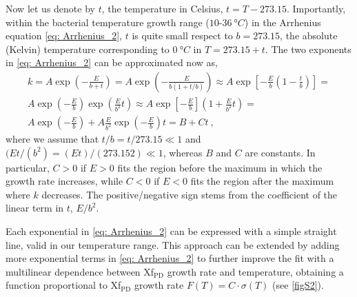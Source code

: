 Now let us denote by $t$, the temperature in Celsius, $t= T-273.15$.
Importantly, within the bacterial temperature growth range
($10$-$\SI{36}{\degree C}$) in the Arrhenius equation \cref{eq: Arrhenius_2},
$t$ is quite small respect to $b = 273.15$, the absolute (Kelvin) temperature
corresponding to $\SI{0}{\degree C}$ in $T = 273.15 + t$. The two exponents in
\cref{eq: Arrhenius_2} can be approximated now as,
\begin{multline}
    k=A \exp \left(-\frac{E}{b+t}\right)=A \exp
    \left(-\frac{E}{b(1+t/b)}\right) \approx A \exp
    \left[-\frac{E}{b}\left(1-\frac{t}{b}\right)\right]= \\
    A \exp \left(-\frac{E}{b}\right) \exp \left(\frac{E}{b^{2}} t\right)
    \approx A \exp \left[-\frac{E}{b}\right]\left(1+\frac{E}{b^{2}}
    t\right)= \\
    A \exp \left(-\frac{E}{b}\right)+A \frac{E}{b^{2}} \exp
    \left(-\frac{E}{b}\right) t=B+C t \ ,
\end{multline}
\label{eq:tempapprox}
where we assume that $t/b = t/273.15 \ll1$ and	$(Et/(b^2) = (Et)/(273.152)
    \ll1$, whereas $B$ and $C$ are constants. In particular, $C>0$ if $E>0$
fits
the region before the maximum in which the growth rate increases, while $C<0$
if $E<0$ fits the region after the maximum where $k$ decreases. The
positive/negative sign stems from the coefficient of the linear term in $t$,
$E/b^2$.

Each exponential in \cref{eq: Arrhenius_2} can be expressed with a simple
straight line, valid in our temperature range. This approach can be extended by
adding more exponential terms in \cref{eq: Arrhenius_2} to further improve the
fit with a multilinear dependence between Xf$_{\textrm{PD}}$ growth rate and
temperature, obtaining a function proportional to Xf$_{\textrm{PD}}$ growth
rate $F(T)=C\cdot\sigma(T)$ (see \cref{figS2}).

